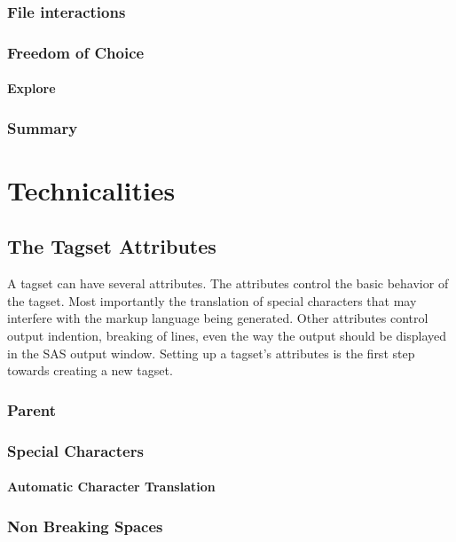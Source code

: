 \documentclass{book}
\begin{document}
\section{File interactions}

\section{Freedom of Choice}

\subsection{Explore}

\section{Summary}

\part{Technicalities}
\chapter{The Tagset Attributes}
A tagset can have several attributes.  The attributes control the basic
behavior of the tagset.  Most importantly the translation of special
characters that may interfere with the markup language being generated.
Other attributes control output indention, breaking of lines, even the
way the output should be displayed in the SAS output window.  Setting 
up a tagset's attributes is the first step towards creating a new tagset.
\section{Parent}

\section{Special Characters}

\subsection{Automatic Character Translation}

\section{Non Breaking Spaces}
\end{document}
